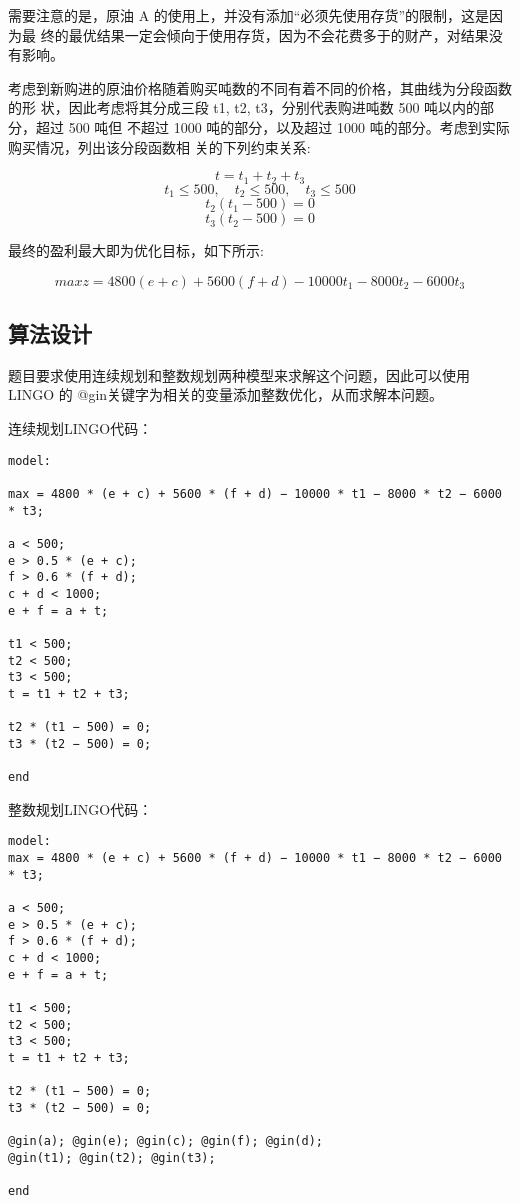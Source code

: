\documentclass{article}
\begin{document}
需要注意的是，原油 A 的使用上，并没有添加“必须先使用存货”的限制，这是因为最 终的最优结果一定会倾向于使用存货，因为不会花费多于的财产，对结果没有影响。

考虑到新购进的原油价格随着购买吨数的不同有着不同的价格，其曲线为分段函数的形 状，因此考虑将其分成三段 t1, t2, t3，分别代表购进吨数 500 吨以内的部分，超过 500 吨但 不超过 1000 吨的部分，以及超过 1000 吨的部分。考虑到实际购买情况，列出该分段函数相 关的下列约束关系:

$$t=t_1+t_2+t_3$$
$$t_1\leq500,\quad t_2\leq500,\quad t_3\leq500$$
$$t_2(t_1-500)=0$$
$$t_3(t_2-500)=0$$


最终的盈利最大即为优化目标，如下所示:


$$max z = 4800(e+c)+5600(f+d)-10000t_1-8000t_2-6000t_3$$

\subsection{算法设计}
题目要求使用连续规划和整数规划两种模型来求解这个问题，因此可以使用 LINGO 的 @gin关键字为相关的变量添加整数优化，从而求解本问题。

连续规划LINGO代码：

\begin{lstlisting}
model:

max = 4800 * (e + c) + 5600 * (f + d) − 10000 * t1 − 8000 * t2 − 6000 * t3;

a < 500;
e > 0.5 * (e + c);
f > 0.6 * (f + d);
c + d < 1000;
e + f = a + t;

t1 < 500;
t2 < 500;
t3 < 500;
t = t1 + t2 + t3;

t2 * (t1 − 500) = 0;
t3 * (t2 − 500) = 0;

end
\end{lstlisting}

整数规划LINGO代码：

\begin{lstlisting}
model:
max = 4800 * (e + c) + 5600 * (f + d) − 10000 * t1 − 8000 * t2 − 6000 * t3;

a < 500;
e > 0.5 * (e + c);
f > 0.6 * (f + d);
c + d < 1000;
e + f = a + t;

t1 < 500;
t2 < 500;
t3 < 500;
t = t1 + t2 + t3;

t2 * (t1 − 500) = 0;
t3 * (t2 − 500) = 0;

@gin(a); @gin(e); @gin(c); @gin(f); @gin(d);
@gin(t1); @gin(t2); @gin(t3);

end
\end{lstlisting}
\end{document}
